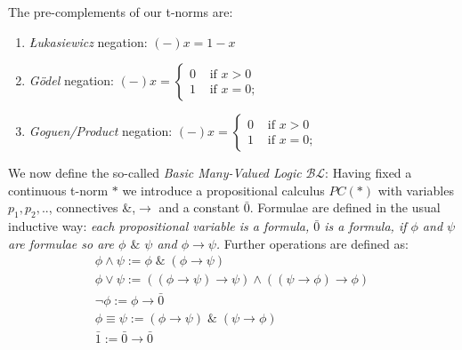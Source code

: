  \begin{lem}
 	The pre-complements of our t-norms are:
 	 \begin{enumerate}[label=(\roman*)]
 		\item \emph{\L{}ukasiewicz} negation: $(-)x = 1 - x$
 		\item \emph{Gödel} negation: $(-)x =  \begin{cases}
 				0 &\text{ if }x > 0 \\ 1 &\text{ if }x = 0;
 			\end{cases} $
 		\item \emph{Goguen/Product} negation: $(-)x =  \begin{cases}
 			0 &\text{ if }x > 0 \\ 1 &\text{ if }x = 0;
 		\end{cases} $
 	\end{enumerate}	
 \end{lem}
 We now define the so-called \emph{Basic Many-Valued Logic} $\mathcal{BL}$: \newline
 Having fixed a continuous t-norm $*$ we introduce a propositional calculus $PC(*)$ with variables $p_1,p_2,..$, connectives \&,$\rightarrow$ and a constant $\bar{0}$.\newline
 Formulae are defined in the usual inductive way: \emph{each propositional variable is a formula, $\bar{0}$ is a formula, if $\phi$ and $\psi$ are formulae so are $\phi$ $\&$ $\psi$ and $\phi \rightarrow \psi$.} \newline
 Further operations are defined as:
 \begin{gather*}
 	\phi \land \psi := \phi \; \& \; (\phi \rightarrow \psi) \\
 	\phi \lor \psi := ((\phi \rightarrow \psi)\rightarrow \psi) \land ((\psi \rightarrow \phi)\rightarrow \phi) \\
 	\neg \phi := \phi \rightarrow \bar{0} \\
 	\phi \equiv \psi := (\phi \rightarrow \psi) \; \& \;(\psi \rightarrow \phi) \\
 	\bar{1} := \bar{0} \rightarrow \bar{0}
 \end{gather*}

